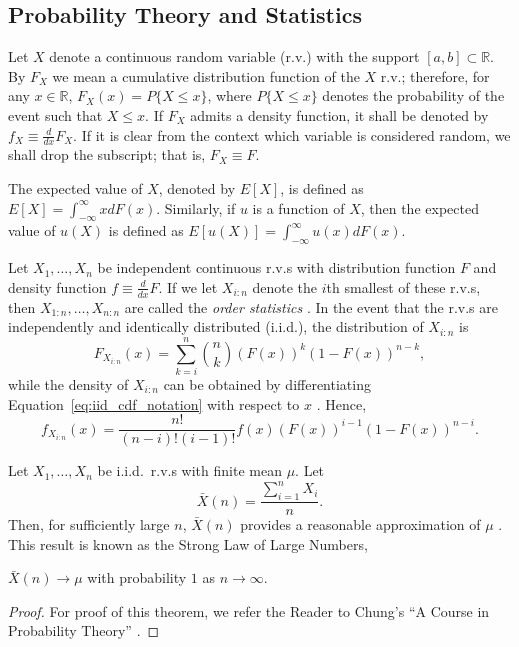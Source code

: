 \subsection{Probability Theory and Statistics} %
\label{sub:probability_notation}
Let $X$ denote a continuous random variable (r.v.) with the support $[a, b]\subset\mathbb{R}$. By $F_{X}$ we mean a cumulative distribution function of the $X$ r.v.; therefore, for any $x\in\mathbb{R}$, $F_{X}(x) = P\{X \le x\}$, where $P\{X\le x\}$ denotes the probability of the event such that $X\le x$. If $F_{X}$ admits a density function, it shall be denoted by $f_{X} \equiv \frac{d}{dx}F_{X}$. If it is clear from the context which variable is considered random, we shall drop the subscript; that is, $F_{X}\equiv F$.

The expected value of $X$, denoted by $E[X]$, is defined as $E[X] = \int_{-\infty}^{\infty} xdF(x)$. Similarly, if $u$ is a function of $X$, then the expected value of $u(X)$ is defined as $E[u(X)] = \int_{-\infty}^{\infty} u(x)dF(x)$.

Let $X_1, \ldots, X_n$ be independent continuous r.v.s with distribution function $F$ and density function $f\equiv \frac{d}{dx}F$. If we let $X_{i:n}$ denote the $i$th smallest of these r.v.s, then $X_{1:n}, \ldots,X_{n:n}$ are called the \emph{order statistics} \cite{Arnold08,David03}. In the event that the r.v.s are independently and identically distributed (i.i.d.), the distribution of $X_{i:n}$ is
\begin{equation}
	\label{eq:iid_cdf_notation}
	F_{X_{i:n}}(x) = \sum_{k=i}^{n} \binom{n}{k} (F(x))^k (1-F(x))^{n-k},
\end{equation}
while the density of $X_{i:n}$ can be obtained by differentiating Equation~\eqref{eq:iid_cdf_notation} with respect to $x$ \cite{Ross10}. Hence,
\begin{equation}
	\label{eq:iid_pdf_notation}
	f_{X_{i:n}}(x) = \frac{n!}{(n-i)!(i-1)!} f(x) (F(x))^{i-1} (1-F(x))^{n-i}.
\end{equation}

Let $X_1,\ldots,X_n$ be i.i.d.~r.v.s with finite mean $\mu$. Let
\begin{equation*}
  \bar{X}(n) = \frac{\sum_{i=1}^n X_i}{n}.
\end{equation*}
Then, for sufficiently large $n$, $\bar{X}(n)$ provides a reasonable approximation of $\mu$ \cite{LawChapter42007}. This result is known as the Strong Law of Large Numbers,
\begin{thm}
$\bar{X}(n)\rightarrow\mu$ with probability $1$ as $n\rightarrow\infty$.
\end{thm}
\begin{proof}
For proof of this theorem, we refer the Reader to Chung's ``A Course in Probability Theory'' \cite{Chung2001}.
\end{proof}

